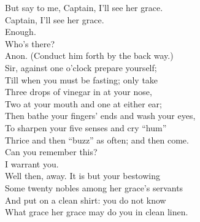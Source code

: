 \documentclass[a4paper,oneside,12pt]{memoir}
\begin{document}
\begin{drama*}
But say to me, Captain, I'll see her grace.\\
\dapperspeaks Captain, I'll see her grace.\\
\facespeaks {} Enough.\\
\subtlespeaks {} Who's there?\\
Anon. (Conduct him forth by the back way.)\\
Sir, against one o'clock prepare yourself;\\
Till when you must be fasting; only take\\
Three drops of vinegar in at your nose,\\
Two at your mouth and one at either ear;\\
Then bathe your fingers' ends and wash your eyes,\\
To sharpen your five senses and cry ``hum''\\
Thrice and then ``buzz'' as often; and then come.\\
\facespeaks Can you remember this?\\
\dapperspeaks {} I warrant you.\\
\facespeaks Well then, away. It is but your bestowing\\
Some twenty nobles among her grace's servants\\
And put on a clean shirt: you do not know\\
What grace her grace may do you in clean linen.\\

\scene


\end{drama*}
\end{document}
